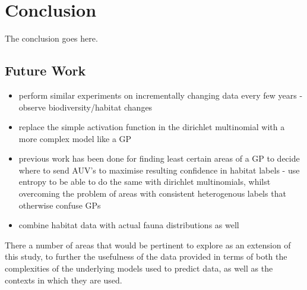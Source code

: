 \chapter{Conclusion} \label{chap:conclusion}

The conclusion goes here.

\section{Future Work}

\begin{itemize}
    \item perform similar experiments on incrementally changing data every few years - observe biodiversity/habitat changes
    \item replace the simple activation function in the dirichlet multinomial with a more complex model like a GP
    \item previous work has been done for finding least certain areas of a GP to decide where to send AUV's to maximise resulting confidence in habitat labels - use entropy to be able to do the same with dirichlet multinomials, whilst overcoming the problem of areas with consistent heterogenous labels that otherwise confuse GPs
    \item combine habitat data with actual fauna distributions as well
\end{itemize}

There a number of areas that would be pertinent to explore as an extension of this study, to further the usefulness of the data provided in terms of both the complexities of the underlying models used to predict data, as well as the contexts in which they are used.


